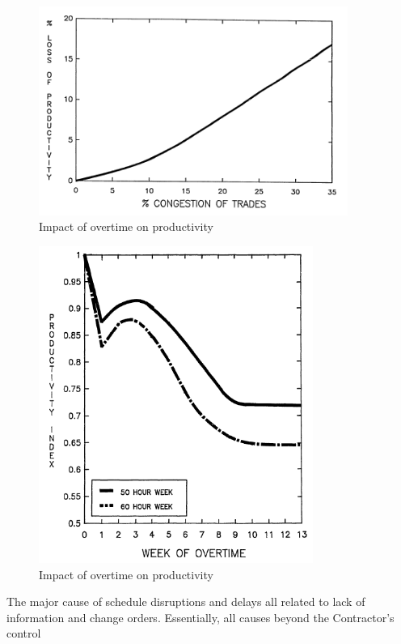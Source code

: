 \begin{figure}[htbp]
\includegraphics[width=0.9\textwidth]{./graphics/AHU/congestion}
\caption{Impact of overtime on productivity}
\label{fig:overtime}
\end{figure}


\begin{figure}[htbp]
\includegraphics[width=0.8\textwidth]{./graphics/AHU/overtime}
\caption{Impact of overtime on productivity}
\label{fig:congestion}
\end{figure}


The major cause of schedule disruptions and delays all related to lack of information and change orders. Essentially, all causes beyond the Contractor's control


